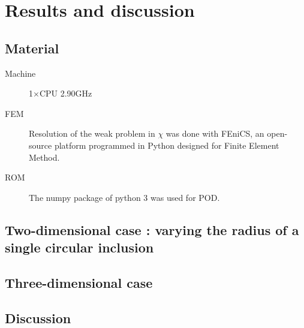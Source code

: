 \section{Results and discussion}\label{res}

\subsection{Material}

\begin{description}
\item [Machine] 1$\times$CPU 2.90GHz
\item [FEM] Resolution of the weak problem in $\chi$ was done with FEniCS, %
an open-source platform programmed in Python designed for Finite Element Method.
\item [ROM] The numpy package of python 3 was used for POD.
\end{description}

\subsection{Two-dimensional case : varying the radius of a single circular inclusion}


\newpage
\subsection{Three-dimensional case}



\newpage
\subsection{Discussion}









